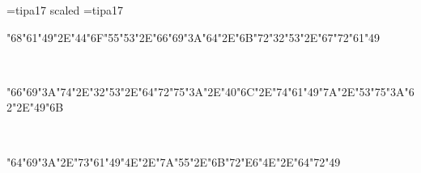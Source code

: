 \font\ipa=tipa17 scaled  \font\acc=tipa17
\def\tl#1{{\acc\accent"00 #1}}
\def\tm#1{{\acc\accent"09 #1}}
\def\u#1{{\acc\accent"08 #1}}
\def\th#1{{\acc\accent"01 #1}}
\def\thh#1{{\acc\accent"05 #1}}
\def\tll#1{{\acc\accent"0D #1}}
\null\vfill
\centerline{\ipa\char"68\ipa\char"61\ipa\char"49\ipa\char"2E\ipa\char"44\ipa\char"6F\ipa\char"55\ipa\char"53\ipa\char"2E\ipa\char"66\ipa\char"69\ipa\char"3A\ipa\char"64\ipa\char"2E\ipa\char"6B\ipa\char"72\ipa\char"32\ipa\char"53\ipa\char"2E\ipa\char"67\ipa\char"72\ipa\char"61\ipa\char"49}\

\centerline{\ipa\char"66\ipa\char"69\ipa\char"3A\ipa\char"74\ipa\char"2E\ipa\char"32\ipa\char"53\ipa\char"2E\ipa\char"64\ipa\char"72\ipa\char"75\ipa\char"3A\ipa\char"2E\ipa\char"40\ipa\char"6C\ipa\char"2E\ipa\char"74\ipa\char"61\ipa\char"49\ipa\char"7A\ipa\char"2E\ipa\char"53\ipa\char"75\ipa\char"3A\ipa\char"62\ipa\char"2E\ipa\char"49\ipa\char"6B}\

\centerline{\ipa\char"64\ipa\char"69\ipa\char"3A\ipa\char"2E\ipa\char"73\ipa\char"61\ipa\char"49\ipa\char"4E\ipa\char"2E\ipa\char"7A\ipa\char"55\ipa\char"2E\ipa\char"6B\ipa\char"72\ipa\char"E6\ipa\char"4E\ipa\char"2E\ipa\char"64\ipa\char"72\ipa\char"49}\bye